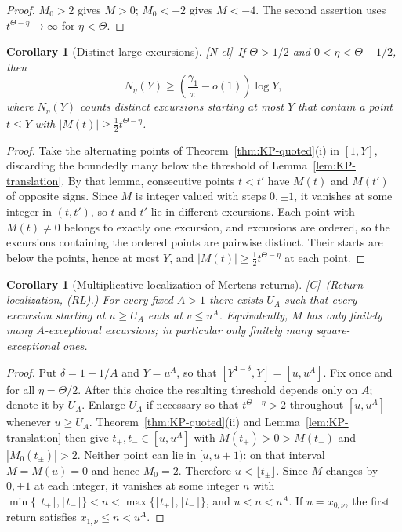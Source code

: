 \documentclass[11pt,reqno]{amsart}
\numberwithin{equation}{section}
\theoremstyle{plain}
\newtheorem{corollary}[theorem]{Corollary}
\theoremstyle{definition}
\theoremstyle{remark}
\newcommand{\tagNE}{\textup{[N-el]}}
\newcommand{\tagC}{\textup{[C]}}
\begin{document}
\begin{proof}
$M_0>2$ gives $M>0$; $M_0<-2$ gives $M<-4$. The second assertion uses
$t^{\Theta-\eta}\to\infty$ for $\eta<\Theta$.
\end{proof}

\begin{corollary}[Distinct large excursions]
\label{cor:KP-large-excursions}
\tagNE\ If $\Theta>1/2$ and $0<\eta<\Theta-1/2$, then
\begin{equation}
\label{eq:KP-large-excursions}
N_\eta(Y)\ge\left(\frac{\gamma_1}{\pi}-o(1)\right)\log Y,
\end{equation}
where $N_\eta(Y)$ counts distinct excursions starting at most $Y$ that
contain a point $t\le Y$ with $|M(t)|\ge\tfrac12 t^{\Theta-\eta}$.
\end{corollary}

\begin{proof}
Take the alternating points of Theorem~\ref{thm:KP-quoted}(i) in $[1,Y]$,
discarding the boundedly many below the threshold of
Lemma~\ref{lem:KP-translation}. By that lemma, consecutive points $t<t'$
have $M(t)$ and $M(t')$ of opposite signs. Since $M$ is integer valued with
steps $0,\pm1$, it vanishes at some integer in $(t,t')$, so $t$ and $t'$ lie
in different excursions. Each point with $M(t)\ne0$ belongs to exactly one
excursion, and excursions are ordered, so the excursions containing the
ordered points are pairwise distinct. Their starts are below the points,
hence at most $Y$, and $|M(t)|\ge\frac12t^{\Theta-\eta}$ at each point.
\end{proof}

\begin{corollary}[Multiplicative localization of Mertens returns]
\label{cor:KP-local-returns}
\tagC\ \textup{(Return localization, (RL).)} For every fixed $A>1$ there exists $U_A$ such that every excursion starting
at $u\ge U_A$ ends at $v\le u^A$. Equivalently, $M$ has only finitely many
$A$-exceptional excursions; in particular only finitely many
square-exceptional ones.
\end{corollary}

\begin{proof}
Put $\delta=1-1/A$ and $Y=u^A$, so that
$[Y^{1-\delta},Y]=[u,u^A]$.  Fix once and for all
$\eta=\Theta/2$.  After this choice the resulting threshold depends only
on $A$; denote it by $U_A$.  Enlarge $U_A$ if necessary so that
$t^{\Theta-\eta}>2$ throughout $[u,u^A]$ whenever $u\ge U_A$.
Theorem~\ref{thm:KP-quoted}(ii) and Lemma~\ref{lem:KP-translation} then give
$t_+,t_-\in[u,u^A]$ with $M(t_+)>0>M(t_-)$ and
$|M_0(t_\pm)|>2$.  Neither point can lie in $[u,u+1)$: on that interval
$M=M(u)=0$ and hence $M_0=2$.  Therefore $u<\lfloor t_\pm\rfloor$. Since $M$ changes by
$0,\pm1$ at each integer, it vanishes at some integer $n$ with
$\min\{\lfloor t_+\rfloor,\lfloor t_-\rfloor\}<n<\max\{\lfloor t_+\rfloor,\lfloor t_-\rfloor\}$, and $u<n<u^A$. If
$u=x_{0,\nu}$, the first return satisfies $x_{1,\nu}\le n<u^A$.
\end{proof}
\end{document}
